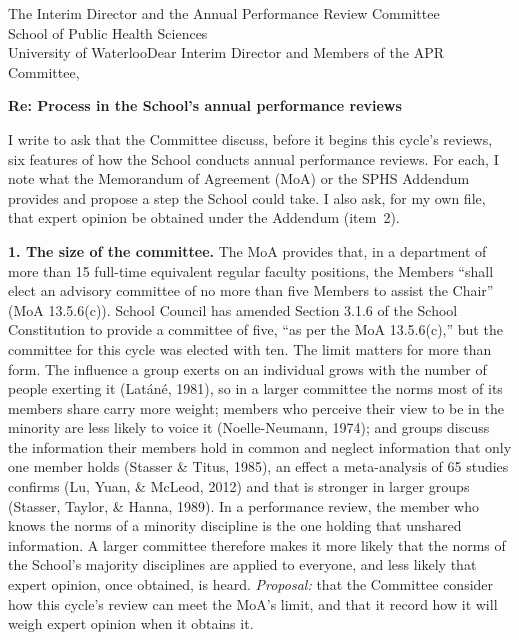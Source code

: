 \begin{aprletter}{%
The Interim Director and the Annual Performance Review Committee\\
School of Public Health Sciences\\
University of Waterloo}{Dear Interim Director and Members of the APR Committee,}

\textbf{Re: Process in the School's annual performance reviews}

I write to ask that the Committee discuss, before it begins this cycle's reviews, six features of how the School conducts annual performance reviews. For each, I note what the Memorandum of Agreement (MoA) or the SPHS Addendum provides and propose a step the School could take. I also ask, for my own file, that expert opinion be obtained under the Addendum (item~2).

\textbf{1. The size of the committee.} The MoA provides that, in a department of more than 15 full-time equivalent regular faculty positions, the Members ``shall elect an advisory committee of no more than five Members to assist the Chair'' (MoA 13.5.6(c)). School Council has amended Section 3.1.6 of the School Constitution to provide a committee of five, ``as per the MoA 13.5.6(c),'' but the committee for this cycle was elected with ten. The limit matters for more than form. The influence a group exerts on an individual grows with the number of people exerting it (Lat\'an\'e, 1981), so in a larger committee the norms most of its members share carry more weight; members who perceive their view to be in the minority are less likely to voice it (Noelle-Neumann, 1974); and groups discuss the information their members hold in common and neglect information that only one member holds (Stasser \& Titus, 1985), an effect a meta-analysis of 65 studies confirms (Lu, Yuan, \& McLeod, 2012) and that is stronger in larger groups (Stasser, Taylor, \& Hanna, 1989). In a performance review, the member who knows the norms of a minority discipline is the one holding that unshared information. A larger committee therefore makes it more likely that the norms of the School's majority disciplines are applied to everyone, and less likely that expert opinion, once obtained, is heard. \emph{Proposal:} that the Committee consider how this cycle's review can meet the MoA's limit, and that it record how it will weigh expert opinion when it obtains it.


\end{aprletter}
